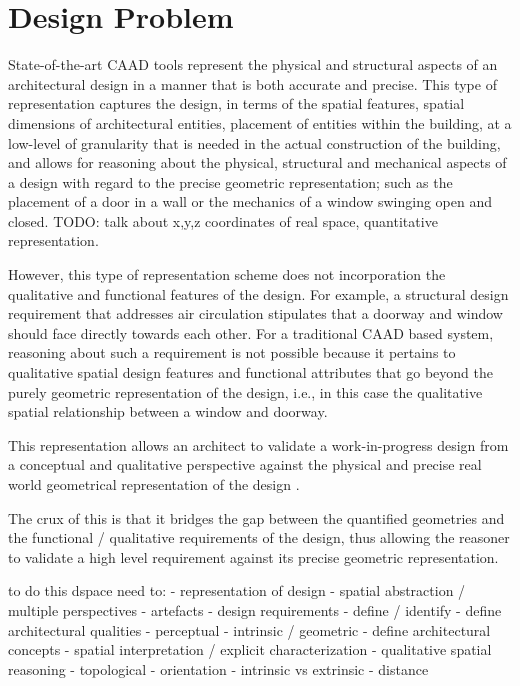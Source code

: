 \documentclass[12pt]{ucthesis}
\begin{document}
\section{Design Problem}
State-of-the-art CAAD tools represent the physical and structural aspects of an architectural design in a manner that is both accurate and precise. This type of representation captures the design, in terms of the spatial features, spatial dimensions of architectural entities, placement of entities within the building, at a low-level of granularity that is needed in the actual construction of the building, and allows for reasoning about the physical, structural and mechanical aspects of a design with regard to the precise geometric representation; such as the placement of a door in a wall or the mechanics of a window swinging open and closed. TODO: talk about x,y,z coordinates of real space, quantitative representation.

However, this type of representation scheme does not incorporation the qualitative and functional features of the design. For example, a structural design requirement that addresses air circulation stipulates that a doorway and window should face directly towards each other. For a traditional CAAD based system, reasoning about such a requirement is not possible because it pertains to qualitative spatial design features and functional attributes that go beyond the purely geometric representation of the design, i.e., in this case the qualitative spatial relationship between a window and doorway.

This representation allows an architect to validate a work-in-progress design from a conceptual and qualitative perspective against the physical and precise real world geometrical representation of the design \cite{Bhatt}.

 The crux of this is that it bridges the gap between the quantified geometries and the functional / qualitative requirements of the design, thus allowing the reasoner to validate a high level requirement against its precise geometric representation. 

to do this dspace need to:
 - representation of design
 	- spatial abstraction / multiple perspectives
 	- artefacts
 - design requirements - define / identify
 	- define architectural qualities
 		- perceptual
 		- intrinsic / geometric
 	- define architectural concepts
	- spatial interpretation / explicit characterization
 - qualitative spatial reasoning
 	- topological 
 	- orientation
 		- intrinsic vs extrinsic
 	- distance
\end{document}
